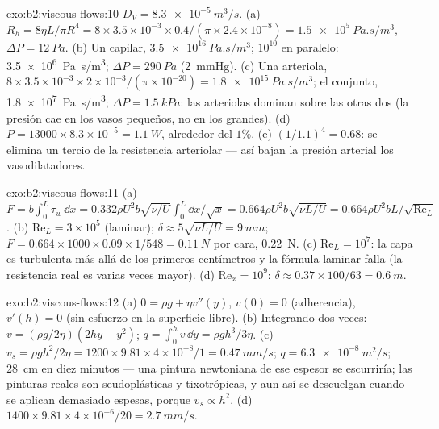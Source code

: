 \begin{solution}{exo:b2:viscous-flows:10}
$D_V = \qty{8.3e-5}{m^3/s}$. (a) $R_h = 8\eta L/\pi R^4 = 8 \times 3.5 \times 10^{-3} \times
0.4/(\pi \times 2.4 \times 10^{-8}) = \qty{1.5e5}{Pa.s/m^3}$, $\Delta P = \qty{12}{Pa}$. (b)
Un capilar, $\qty{3.5e16}{Pa.s/m^3}$; $10^{10}$ en paralelo: \qty{3.5e6}{Pa.s/m^3};
$\Delta P = \qty{290}{Pa}$ (\qty{2}{mmHg}). (c) Una arteriola, $8 \times 3.5 \times 10^{-3}
\times 2 \times 10^{-3}/(\pi \times 10^{-20}) = \qty{1.8e15}{Pa.s/m^3}$; el conjunto,
\qty{1.8e7}{Pa.s/m^3}; $\Delta P = \qty{1.5}{kPa}$: las arteriolas dominan sobre
las otras dos (la presión cae en los vasos pequeños, no en los grandes).
(d) $P = 13000 \times 8.3 \times 10^{-5} = \qty{1.1}{W}$, alrededor del $1\%$. (e)
$(1/1.1)^4 = 0.68$: se elimina un tercio de la resistencia arteriolar ---
así bajan la presión arterial los vasodilatadores.
\end{solution}

\begin{solution}{exo:b2:viscous-flows:11}
(a) $F = b\int_0^L\tau_w\,\dd x = 0.332\rho U^2b\sqrt{\nu/U}\int_0^L\dd x/\sqrt x =
0.664\rho U^2b\sqrt{\nu L/U} = 0.664\rho U^2bL/\sqrt{\mathrm{Re}_L}$. (b) $\mathrm{Re}_L =
3 \times 10^5$ (laminar); $\delta \approx 5\sqrt{\nu L/U} = \qty{9}{mm}$; $F = 0.664 \times 1000
\times 0.09 \times 1/548 = \qty{0.11}{N}$ por cara, \qty{0.22}{N}. (c) $\mathrm{Re}_L = 10^7$:
la capa es turbulenta más allá de los primeros centímetros y la fórmula
laminar falla (la resistencia real es varias veces mayor). (d) $\mathrm{Re}_x =
10^9$: $\delta \approx 0.37 \times 100/63 = \qty{0.6}{m}$.
\end{solution}

\begin{solution}{exo:b2:viscous-flows:12}
(a) $0 = \rho g + \eta v''(y)$, $v(0) = 0$ (adherencia), $v'(h) = 0$ (sin esfuerzo en
la superficie libre). (b) Integrando dos veces: $v = (\rho g/2\eta)(2hy - y^2)$; $q =
\int_0^hv\,\dd y = \rho gh^3/3\eta$. (c) $v_s = \rho gh^2/2\eta = 1200 \times 9.81 \times
4 \times 10^{-8}/1 = \qty{0.47}{mm/s}$; $q = \qty{6.3e-8}{m^2/s}$; \qty{28}{cm} en diez
minutos --- una pintura newtoniana de ese espesor se escurriría; las
pinturas reales son seudoplásticas y tixotrópicas, y aun así se descuelgan
cuando se aplican demasiado espesas, porque $v_s \propto h^2$. (d) $1400 \times 9.81 \times 4 \times 10^{-6}/20 = \qty{2.7}{mm/s}$.
\end{solution}

